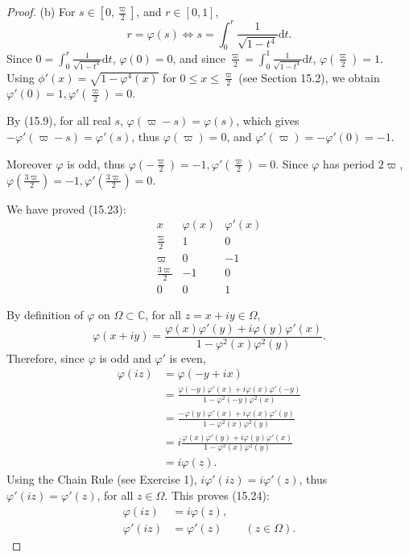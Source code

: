 \documentclass[11pt,a4paper]{article}
\newcommand{\D}{\mathrm{d}}
\newcommand{\C}{\mathbb{C}}
\begin{document}
\begin{proof}
\item[(b)] For $s \in [0 , \frac{\varpi}{2}]$, and $r\in [0,1]$,
$$r = \varphi(s) \iff s = \int_0^r  \frac{1}{\sqrt{1 - t^4}} \D t.$$
Since $0 = \int_0^r  \frac{1}{\sqrt{1 - t^4}} \D t$, $\varphi(0) = 0$, and since $\frac{\varpi}{2} = \int_0^1\frac{1}{\sqrt{1 - t^4}} \D t$, $\varphi\left( \frac{\varpi}{2}\right) = 1$. Using $\phi'(x) = \sqrt{1 - \varphi^4(x)}$ for $0 \leq x \leq \frac{\varpi}{2}$ (see Section 15.2), we obtain $\varphi'(0) = 1, \varphi'\left (\frac{\varpi}{2}\right) = 0$. 

By (15.9), for all real $s$, $\varphi(\varpi - s) = \varphi(s)$, which gives $- \varphi'(\varpi - s) = \varphi'(s)$,  thus $\varphi(\varpi) = 0$, and $\varphi'(\varpi) = -\varphi'(0) = -1$.

Moreover $\varphi$ is odd, thus $\varphi\left( - \frac{\varpi}{2}\right) = -1, \varphi'\left(\frac{\varpi}{2}\right) = 0$. Since $\varphi$ has period $2 \varpi$,
$\varphi \left( \frac{3 \varpi}{2}\right) = -1, \varphi'\left(\frac{3\varpi}{2}\right) = 0$.

We have proved (15.23):
$$
\begin{array}{c|c|c}
x & \varphi(x) & \varphi'(x)\\
\hline
\frac{\varpi}{2}  & 1 & 0\\
\varpi & 0 & -1\\
\frac{3\varpi}{2} & - 1 & 0\\
0 & 0 & 1
\end{array}
$$

By definition of $\varphi$ on $\Omega \subset \C$, for all $z = x + iy \in \Omega$,
$$\varphi(x+iy) = \frac{\varphi(x) \varphi'(y) + i \varphi(y) \varphi'(x)}{1 - \varphi^2(x) \varphi^2(y)}.$$
Therefore, since $\varphi$ is odd and $\varphi'$ is even,
\begin{align*}
\varphi(iz) &= \varphi(-y + ix)\\
& = \frac{\varphi(-y) \varphi'(x) + i \varphi(x) \varphi'(-y)}{1 - \varphi^2(-y) \varphi^2(x)}\\
&=   \frac{-\varphi(y) \varphi'(x) + i \varphi(x) \varphi'(y)}{1 - \varphi^2(x) \varphi^2(y)}\\
&= i \frac{\varphi(x) \varphi'(y) + i \varphi(y) \varphi'(x)}{1 - \varphi^2(x) \varphi^2(y)}\\
&= i \varphi(z).
\end{align*}
Using the Chain Rule (see Exercise 1), $i \varphi'(iz) = i \varphi'(z)$, thus $\varphi'(iz) = \varphi'(z)$, for all $z \in \Omega$. This proves (15.24):
\begin{align*}
\varphi(iz) &= i \varphi(z),\\
\varphi'(iz) &= \varphi'(z)\qquad (z \in \Omega).
\end{align*}


\end{proof}
\end{document}
